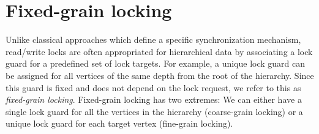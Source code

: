 \section{Fixed-grain locking}
Unlike classical approaches which define a specific synchronization mechanism, read/write locks are often appropriated for hierarchical data by associating a lock guard for a predefined set of lock targets. For example, a unique lock guard can be assigned for all vertices of the same depth from the root of the hierarchy. Since this guard is fixed and does not depend on the lock request, we refer to this as \emph{fixed-grain locking}. 
Fixed-grain locking has two extremes: We can either have a single lock guard for all the vertices in the hierarchy (coarse-grain locking) or a unique lock guard for each target vertex (fine-grain locking).




